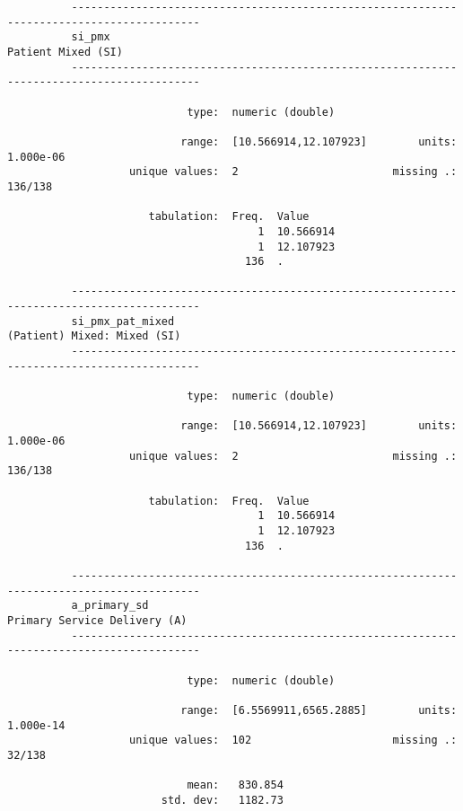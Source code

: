\documentclass{article}
\begin{document}
\begin{verbatim}
          ------------------------------------------------------------------------------------------
          si_pmx                                                                  Patient Mixed (SI)
          ------------------------------------------------------------------------------------------
          
                            type:  numeric (double)
          
                           range:  [10.566914,12.107923]        units:  1.000e-06
                   unique values:  2                        missing .:  136/138
          
                      tabulation:  Freq.  Value
                                       1  10.566914
                                       1  12.107923
                                     136  .
          
          ------------------------------------------------------------------------------------------
          si_pmx_pat_mixed                                               (Patient) Mixed: Mixed (SI)
          ------------------------------------------------------------------------------------------
          
                            type:  numeric (double)
          
                           range:  [10.566914,12.107923]        units:  1.000e-06
                   unique values:  2                        missing .:  136/138
          
                      tabulation:  Freq.  Value
                                       1  10.566914
                                       1  12.107923
                                     136  .
          
          ------------------------------------------------------------------------------------------
          a_primary_sd                                                  Primary Service Delivery (A)
          ------------------------------------------------------------------------------------------
          
                            type:  numeric (double)
          
                           range:  [6.5569911,6565.2885]        units:  1.000e-14
                   unique values:  102                      missing .:  32/138
          
                            mean:   830.854
                        std. dev:   1182.73
          

\end{verbatim}
\end{document}
